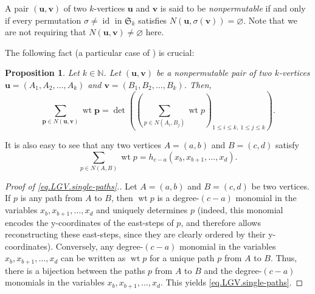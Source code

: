 \documentclass[reqno]{amsart}%
\newcommand{\0}{\phantom{c}}
\let\sumnonlimits\sum
\renewcommand{\sum}{\sumnonlimits\limits}
\newcommand{\defn}[1]{{\color{darkred}\emph{#1}}}
\theoremstyle{plain}
\newtheorem{prop}[thm]{Proposition}
\theoremstyle{definition}
\numberwithin{equation}{section}
\begin{document}
A pair $\left(  \mathbf{u},\mathbf{v}\right)  $ of two $k$-vertices
$\mathbf{u}$ and $\mathbf{v}$ is said to be \defn{nonpermutable} if and only
if every permutation $\sigma\neq\operatorname*{id}$ in $\mathfrak{S}_{k}$
satisfies $N\left(  \mathbf{u},\sigma\left(  \mathbf{v}\right)  \right)
=\varnothing$. Note that we are not requiring that $N\left(  \mathbf{u}%
,\mathbf{v}\right)  \neq\varnothing$ here.

The following fact (a particular case of \cite[Corollary 2]{GesVie89}) is crucial:

\begin{prop}
\label{prop.LGV.nonper}Let $k\in\mathbb{N}$. Let $\left(  \mathbf{u}%
,\mathbf{v}\right)  $ be a nonpermutable pair of two $k$-vertices
$\mathbf{u}=\left(  A_{1},A_{2},\ldots,A_{k}\right)  $ and $\mathbf{v}=\left(
B_{1},B_{2},\ldots,B_{k}\right)  $. Then,%
\[
\sum_{\mathbf{p}\in N\left(  \mathbf{u},\mathbf{v}\right)  }\operatorname*{wt}%
\mathbf{p}=\det\left(  \left(  \sum_{p\in N\left(  A_{i},B_{j}\right)
}\operatorname*{wt}p\right)  _{1\leq i\leq k,\ 1\leq j\leq k}\right)  .
\]

\end{prop}

It is also easy to see that any two vertices $A=\left(  a,b\right)  $ and
$B=\left(  c,d\right)  $ satisfy%
\begin{equation}
\sum_{p\in N\left(  A,B\right)  }\operatorname*{wt}p=h_{c-a}\left(
x_{b},x_{b+1},\ldots,x_{d}\right)  . \label{eq.LGV.single-paths}%
\end{equation}


\begin{proof}
[Proof of \eqref{eq.LGV.single-paths}.]Let $A=\left(  a,b\right)  $ and
$B=\left(  c,d\right)  $ be two vertices. If $p$ is any path from $A$ to $B$,
then $\operatorname*{wt}p$ is a degree-$\left(  c-a\right)  $ monomial in the
variables $x_{b},x_{b+1},\ldots,x_{d}$ and uniquely determines $p$ (indeed,
this monomial encodes the y-coordinates of the east-steps of $p$, and
therefore allows reconstructing these east-steps, since they are clearly
ordered by their y-coordinates). Conversely, any degree-$\left(  c-a\right)  $
monomial in the variables $x_{b},x_{b+1},\ldots,x_{d}$ can be written as
$\operatorname*{wt}p$ for a unique path $p$ from $A$ to $B$. Thus, there is a
bijection between the paths $p$ from $A$ to $B$ and the degree-$\left(
c-a\right)  $ monomials in the variables $x_{b},x_{b+1},\ldots,x_{d}$. This
yields \eqref{eq.LGV.single-paths}.
\end{proof}
\end{document}
